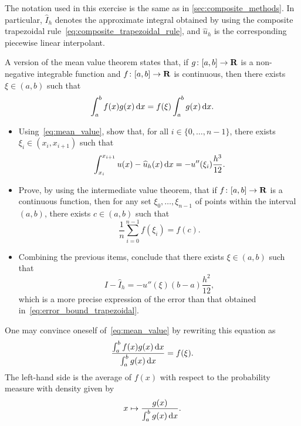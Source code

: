 \begin{exercise}
    The notation used in this exercise is the same as in \cref{sec:composite_methods}.
    In particular, $\widehat I_h$ denotes the approximate integral obtained by using the composite trapezoidal rule~\eqref{eq:composite_trapezoidal_rule},
    and $\widehat u_h$ is the corresponding piecewise linear interpolant.

    A version of the mean value theorem states that,
    if $g\colon [a, b] \to \mathbf R$ is a non-negative integrable function
    and $f\colon [a, b] \to \mathbf R$ is continuous,
    then there exists $\xi \in (a, b)$ such that
    \begin{equation}
        \label{eq:mean_value}
        \int_{a}^{b} f(x) g(x) \, \mathrm d x = f(\xi) \int_{a}^{b} g(x) \, \mathrm d x.
    \end{equation}
    \begin{itemize}
        \item
            Using~\eqref{eq:mean_value},
            show that, for all $i \in \{0, \dotsc, n-1\}$,
            there exists $\xi_i \in (x_i, x_{i+1})$ such that
            \[
                \int_{x_i}^{x_{i+1}} u(x) - \widehat u_h(x) \, \mathrm d x =
                - u''(\xi_i) \frac{h^3}{12}.
            \]

        \item
            Prove, by using the intermediate value theorem,
            that if $f\colon [a, b] \to \mathbf R$ is a continuous function,
            then for any set $\xi_0, \dotsc, \xi_{n-1}$ of points within the interval $(a, b)$,
            there exists $c \in (a, b)$ such that
            \[
                \frac{1}{n} \sum_{i=0}^{n-1} f (\xi_i)  = f(c).
            \]

        \item
            Combining the previous items,
            conclude that there exists $\xi \in (a, b)$ such that
            \[
                I - \widehat I_h = - u''(\xi) (b-a) \frac{h^2}{12},
            \]
            which is a more precise expression of the error than that obtained in~\eqref{eq:error_bound_trapezoidal}.
    \end{itemize}
\end{exercise}
\begin{remark}
    One may convince oneself of~\eqref{eq:mean_value} by rewriting this equation as
    \[
        \frac{\int_{a}^{b} f(x) g(x) \, \mathrm d x}{\int_{a}^{b} g(x) \, \mathrm d x} = f(\xi).
    \]
    The left-hand side is the average of $f(x)$ with respect to the probability measure
    with density given by
    \[
        x \mapsto
        \frac{g(x)}{\int_{a}^{b} g(x) \, \mathrm d x}.
    \]
\end{remark}

